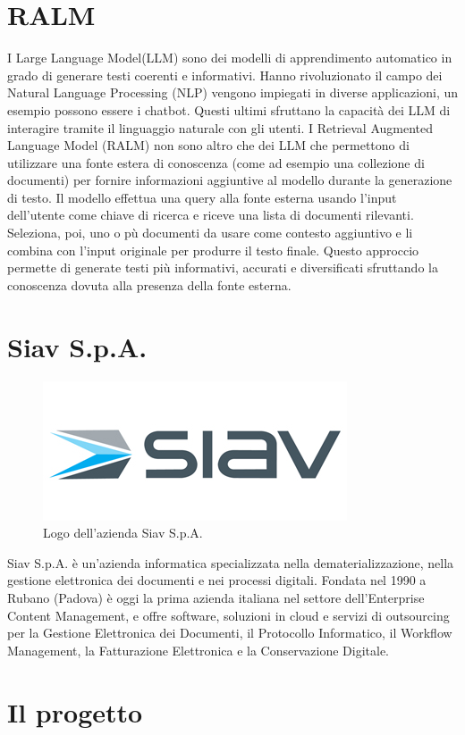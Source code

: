 \section{RALM}
I Large Language Model(LLM) sono dei modelli di apprendimento automatico in grado di generare testi coerenti e informativi.
Hanno rivoluzionato il campo dei Natural Language Processing (NLP) vengono impiegati in diverse applicazioni, un esempio possono essere i chatbot.
Questi ultimi sfruttano la capacità dei LLM di interagire tramite il linguaggio naturale con gli utenti.
I Retrieval Augmented Language Model (RALM) non sono altro che dei LLM che permettono di utilizzare una fonte estera di conoscenza (come ad esempio una collezione di documenti)
per fornire informazioni aggiuntive al modello durante la generazione di testo.
Il modello effettua una query alla fonte esterna usando l'input dell'utente come chiave di ricerca e riceve una lista di documenti rilevanti.
Seleziona, poi, uno o pù documenti da usare come contesto aggiuntivo e li combina con l'input originale per produrre il testo finale.
Questo approccio permette di generate testi più informativi, accurati e diversificati sfruttando la conoscenza dovuta alla presenza della fonte esterna.

\section{Siav S.p.A.}

\begin{figure}[!h] 
    \centering 
    \includegraphics[width=0.5\columnwidth]{images/logoSiav.jpg} 
    \caption{Logo dell'azienda Siav S.p.A.}
\end{figure}
Siav S.p.A. è un’azienda informatica specializzata nella dematerializzazione, nella gestione elettronica dei documenti e nei processi digitali.
Fondata nel 1990 a Rubano (Padova) è oggi la prima azienda italiana nel settore dell’Enterprise Content Management, e offre software, soluzioni in cloud e servizi di outsourcing per la Gestione Elettronica dei Documenti, il Protocollo Informatico, il Workflow Management, la Fatturazione Elettronica e la Conservazione Digitale.

\section{Il progetto}

